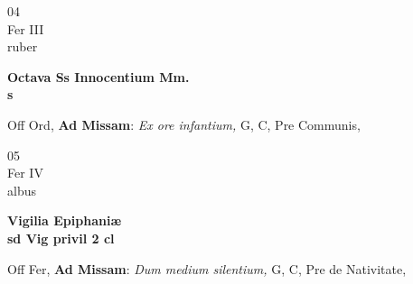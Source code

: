 \documentclass[10pt, openany]{book}
\begin{document}
        \begin{center}
            \begin{minipage}{3.5in}
                \vspace{2em}
                \begin{minipage}{0.5in}
                    {\Huge 04} \\
                    {\normalsize Fer III} \\
                    {\normalsize ruber}
                \end{minipage}
                \begin{minipage}{3.0in}
                    \textbf{ \large Octava Ss Innocentium Mm. \\
                    \textnormal{\normalsize s}} \\ 
                \end{minipage}
                \begin{justify}Off Ord, \textbf{Ad Missam}: \textit{Ex ore infantium,} G, C, Pre Communis,  
                \end{justify}
            \end{minipage}
        \end{center}
    
        \begin{center}
            \begin{minipage}{3.5in}
                \vspace{2em}
                \begin{minipage}{0.5in}
                    {\Huge 05} \\
                    {\normalsize Fer IV} \\
                    {\normalsize albus}
                \end{minipage}
                \begin{minipage}{3.0in}
                    \textbf{ \large Vigilia Epiphaniæ \\
                    \textnormal{\normalsize sd Vig privil 2 cl}} \\ 
                \end{minipage}
                \begin{justify}Off Fer, \textbf{Ad Missam}: \textit{Dum medium silentium,} G, C, Pre de Nativitate,  
                \end{justify}
            \end{minipage}
        \end{center}
    
\end{document}
